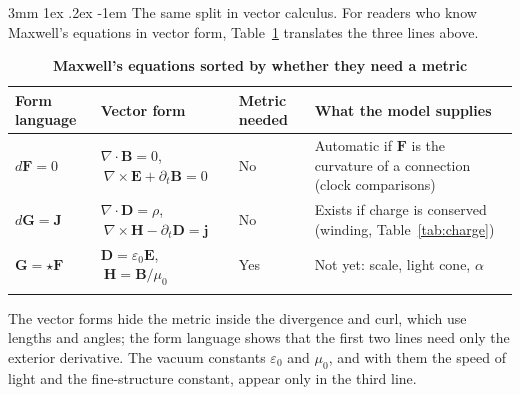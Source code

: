 \documentclass[%
 reprint, amsmath,amssymb, aps, prb, ]{revtex4-2}
\makeatletter
\numberwithin{equation}{section}
\renewcommand\paragraph{%
  \@startsection{paragraph}{4}{\z@}%
    {3mm \@plus 1ex \@minus .2ex}
    {-1em}
    {\normalfont\normalsize\itshape}}
\newcommand{\FF}{\mathbf{F}}
\newcommand{\hodge}{\star}
\makeatother
\begin{document}
\paragraph{The same split in vector calculus.} For readers who know Maxwell's equations in vector form, Table~\ref{tab:maxwell} translates the three lines above.

\begin{table}[t!]
\centering
\caption{\textbf{Maxwell's equations sorted by whether they need a metric}}
\label{tab:maxwell}
\renewcommand{\arraystretch}{1.4}
\begin{tabular}{p{3.0cm}p{4.6cm}p{3.6cm}p{4.3cm}}
\toprule
\textbf{Form language} & \textbf{Vector form} & \textbf{Metric needed} & \textbf{What the model supplies} \\
\midrule
$d\FF=0$
& $\nabla\cdot\mathbf{B}=0$, $\ \nabla\times\mathbf{E}+\partial_t\mathbf{B}=0$
& No
& Automatic if $\FF$ is the curvature of a connection (clock comparisons) \\
\addlinespace[0.3cm]
$d\mathbf{G}=\mathbf{J}$
& $\nabla\cdot\mathbf{D}=\rho$, $\ \nabla\times\mathbf{H}-\partial_t\mathbf{D}=\mathbf{j}$
& No
& Exists if charge is conserved (winding, Table~\ref{tab:charge}) \\
\addlinespace[0.3cm]
$\mathbf{G}=\hodge\FF$
& $\mathbf{D}=\varepsilon_0\mathbf{E}$, $\ \mathbf{H}=\mathbf{B}/\mu_0$
& Yes
& Not yet: scale, light cone, $\alpha$ \\
\addlinespace[0.2cm]
\bottomrule
\end{tabular}
\vspace{0.2cm}
\begin{minipage}{0.95\textwidth}
\justifying\footnotesize
The vector forms hide the metric inside the divergence and curl, which use lengths and angles; the form language shows that the first two lines need only the exterior derivative. The vacuum constants $\varepsilon_0$ and $\mu_0$, and with them the speed of light and the fine-structure constant, appear only in the third line.
\end{minipage}
\end{table}
\end{document}
